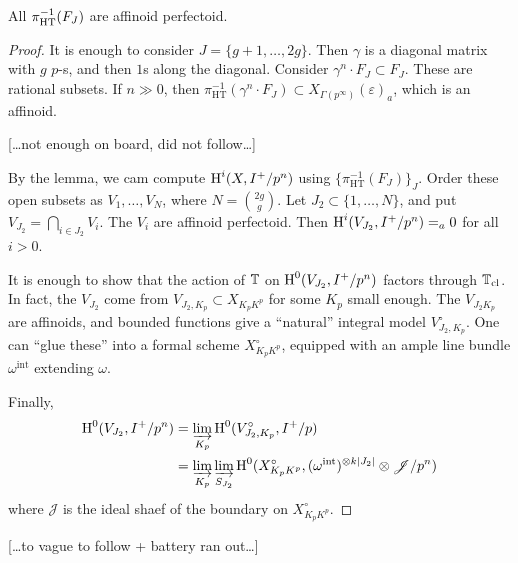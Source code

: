 \begin{lemma}
All $\pi_\textnormal{HT}^{-1}(F_J)$ are affinoid perfectoid. 
\end{lemma}
\begin{proof}
It is enough to consider $J=\{g+1,\dots,2 g\}$. Then $\gamma$ is a diagonal matrix with 
$g$ $p$-s, and then $1$s along the diagonal. Consider $\gamma^n\cdot F_J\subset F_J$. 
These are rational subsets. If $n\gg 0$, then 
$\pi_\text{HT}^{-1}(\gamma^n\cdot F_J)\subset X_{\Gamma(p^\infty)}(\varepsilon)_a$, 
which is an affinoid. 

[\ldots not enough on board, did not follow\ldots]

By the lemma, we cam compute $\operatorname{H}^i(X,I^+/p^n)$ using 
$\{\pi_\text{HT}^{-1}(F_J)\}_J$. Order these open subsets as 
$V_1,\dots,V_N$, where $N=\binom{2 g}{g}$. Let $J_2\subset \{1,\dots,N\}$, and put 
$V_{J_2} = \bigcap_{i\in J_2} V_i$. The $V_i$ are affinoid perfectoid. Then 
$\operatorname{H}^i(V_{J_2},I^+/p^n) =_a 0$ for all $i>0$. 

It is enough to show that the action of $\mathbb{T}$ on $\operatorname{H}^0(V_{J_2},I^+/p^n)$ factors 
through $\mathbb{T}_\text{cl}$. In fact, the $V_{J_2}$ come from $V_{J_2,K_p}\subset X_{K_p K^p}$ 
for some $K_p$ small enough. The $V_{J_2K_p}$ are affinoids, and bounded functions 
give a ``natural'' integral model $V_{J_2,K_p}^\circ$. One can ``glue these'' into 
a formal scheme $X_{K_p K^p}^\circ$, equipped with an ample line bundle 
$\omega^\text{int}$ extending $\omega$. 

Finally, 
\begin{align*}
  \operatorname{H}^0(V_{J_2}, I^+/p^n) 
    &= \varinjlim_{K_p} \operatorname{H}^0(V_{J_2,K_p}^\circ, I^+/p) \\
    &= \varinjlim_{K_p} \varinjlim_{S_{J_2}} \operatorname{H}^0(X_{K_p K^p}^\circ, (\omega^\text{int})^{\otimes k |J_2|}\otimes \mathscr J/p^n)
\end{align*}
where $\mathscr J$ is the ideal shaef of the boundary on $X_{K_p K^p}^\circ$. 
\end{proof}

[\ldots to vague to follow + battery ran out\ldots ]








